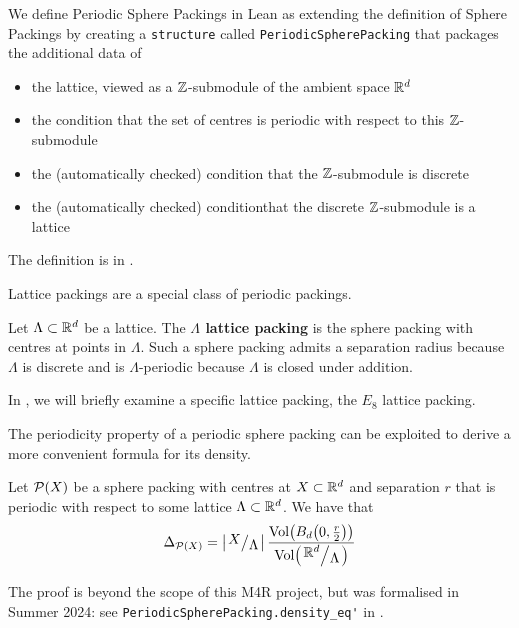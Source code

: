 We define Periodic Sphere Packings in Lean as extending the definition of Sphere Packings by creating a \verb|structure| called \verb|PeriodicSpherePacking| that packages the additional data of
\begin{itemize}
    \item the lattice, viewed as a $\mathbb{Z}$-submodule of the ambient space $\mathbb{R}^d$
    \item the condition that the set of centres is periodic with respect to this $\mathbb{Z}$-submodule
    \item the (automatically checked) condition\footnotemark{} that the $\mathbb{Z}$-submodule is discrete
    \item the (automatically checked) condition\footnotemark[\value{footnote}] that the discrete $\mathbb{Z}$-submodule is a lattice
\end{itemize}
The definition is in \cite[\texttt{SpherePacking.Basic.SpherePacking}]{documentation}.

Lattice packings are a special class of periodic packings.

\begin{boxdefinition}
    Let $\Lambda \subset \mathbb{R}^d$ be a lattice. The \textbf{$\Lambda$ lattice packing} is the sphere packing with centres at points in $\Lambda$. Such a sphere packing admits a separation radius because $\Lambda$ is discrete and is $\Lambda$-periodic because $\Lambda$ is closed under addition.
\end{boxdefinition}

In , we will briefly examine a specific lattice packing, the $E_8$ lattice packing.

The periodicity property of a periodic sphere packing can be exploited to derive a more convenient formula for its density.

\begin{boxproposition}\label{Ch2:Prop:Periodic_Density}
    Let $\mathcal{P}(X)$ be a sphere packing with centres at $X \subset \mathbb{R}^d$ and separation $r$ that is periodic with respect to some lattice $\Lambda \subset \mathbb{R}^d$. We have that
    \begin{align}
        \Delta_{\Pa(X)} = \abs{\quotient{X}{\Lambda}} \frac{\Volof{B_d\of{0, \frac{r}{2}}}}{\Volof{\quotient{\R^d}{\Lambda}}}
        \label{Ch2:Eq:Periodic_Density}
    \end{align}
\end{boxproposition}

The proof is beyond the scope of this M4R project, but was formalised in Summer 2024: see \verb|PeriodicSpherePacking.density_eq'| in \cite[\texttt{SpherePacking.Basic.PeriodicPacking}]{documentation}.

